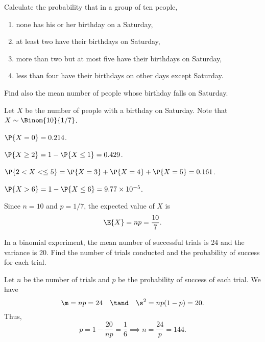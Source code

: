 \begin{problem}
    Calculate the probability that in a group of ten people,
    \begin{enumerate}
        \item none has his or her birthday on a Saturday,
        \item at least two have their birthdays on Saturday,
        \item more than two but at most five have their birthdays on Saturday,
        \item less than four have their birthdays on other days except Saturday.
    \end{enumerate}
    Find also the mean number of people whose birthday falls on Saturday.
\end{problem}
\begin{solution}
    Let $X$ be the number of people with a birthday on Saturday. Note that $X \sim \Binom{10}{1/7}$.
    \begin{ppart}
        $\P{X = 0} = 0.214$.
    \end{ppart}
    \begin{ppart}
        $\P{X \geq 2} = 1 - \P{X \leq 1} = 0.429$.
    \end{ppart}
    \begin{ppart}
        $\P{2 < X < \leq 5} = \P{X = 3} + \P{X = 4} + \P{X = 5} = 0.161$.
    \end{ppart}
    \begin{ppart}
        $\P{X > 6} = 1 - \P{X \leq 6} = 9.77 \times 10^{-5}$.
    \end{ppart}

    Since $n = 10$ and $p = 1/7$, the expected value of $X$ is \[\E{X} = np = \frac{10}{7}.\]
\end{solution}

\begin{problem}
    In a binomial experiment, the mean number of successful trials is 24 and the variance is 20. Find the number of trials conducted and the probability of success for each trial.
\end{problem}
\begin{solution}
    Let $n$ be the number of trials and $p$ be the probability of success of each trial. We have \[\m = np = 24 \quad \tand \quad \s^2 = np(1-p) = 20.\] Thus, \[p = 1 - \frac{20}{np} = \frac16 \implies n = \frac{24}{p} = 144.\]
\end{solution}


